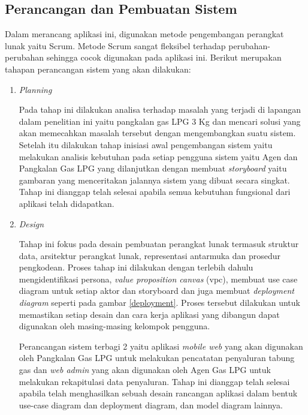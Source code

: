 \subsection{Perancangan dan Pembuatan Sistem}
Dalam merancang aplikasi ini, digunakan metode pengembangan perangkat lunak yaitu Scrum. Metode Scrum sangat fleksibel terhadap perubahan-perubahan sehingga cocok digunakan pada aplikasi ini. Berikut merupakan tahapan perancangan sistem yang akan dilakukan:

\begin{enumerate}[1.]
	\item \emph {Planning}
	
	Pada tahap ini dilakukan analisa terhadap masalah yang terjadi di lapangan dalam penelitian ini yaitu pangkalan gas LPG 3 Kg dan mencari solusi yang akan memecahkan masalah tersebut dengan mengembangkan suatu sistem. Setelah itu dilakukan tahap inisiasi awal pengembangan sistem yaitu melakukan analisis kebutuhan pada setiap pengguna sistem yaitu Agen dan Pangkalan Gas LPG yang dilanjutkan dengan membuat \textit{storyboard} yaitu gambaran yang menceritakan jalannya sistem yang dibuat secara singkat. Tahap ini dianggap telah selesai apabila semua kebutuhan fungsional dari aplikasi telah didapatkan.
	
	

	\item \textit{Design}
	
	\par Tahap ini fokus pada desain pembuatan perangkat lunak termasuk struktur data, arsitektur perangkat lunak, representasi antarmuka dan prosedur pengkodean. Proses tahap ini dilakukan dengan terlebih dahulu mengidentifikasi persona, \textit{value proposition canvas} (vpc), membuat use case diagram untuk setiap aktor dan storyboard dan juga membuat \textit{deployment diagram} seperti pada gambar \ref{deployment}. Proses tersebut dilakukan untuk memastikan setiap desain dan cara kerja aplikasi yang dibangun dapat digunakan oleh masing-masing kelompok pengguna.
	\par Perancangan sistem terbagi 2 yaitu aplikasi \textit{mobile web} yang akan digunakan oleh Pangkalan Gas LPG untuk melakukan pencatatan penyaluran tabung gas dan \textit{web admin} yang akan digunakan oleh Agen Gas LPG untuk melakukan rekapitulasi data penyaluran. Tahap ini dianggap telah selesai apabila telah menghasilkan sebuah desain rancangan aplikasi dalam bentuk use-case diagram dan deployment diagram, dan model diagram lainnya.
	


\end{enumerate}

